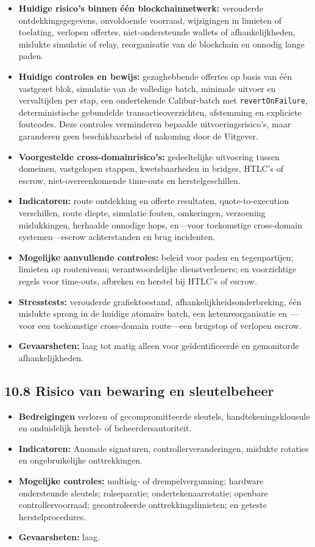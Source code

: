 \documentclass[11pt]{article}
\begin{document}
\begin{itemize}[leftmargin=*]
\item \textbf{Huidige risico's binnen één blockchainnetwerk:} verouderde ontdekkingsgegevens, onvoldoende voorraad, wijzigingen in limieten of toelating, verlopen offertes, niet-ondersteunde wallets of afhankelijkheden, mislukte simulatie of relay, reorganisatie van de blockchain en onnodig lange paden.
\item \textbf{Huidige controles en bewijs:} gezaghebbende offertes op basis van één vastgezet blok, simulatie van de volledige batch, minimale uitvoer en vervaltijden per stap, een ondertekende Calibur-batch met \texttt{revertOnFailure}, deterministische gebundelde transactieoverzichten, afstemming en expliciete foutcodes. Deze controles verminderen bepaalde uitvoeringsrisico's, maar garanderen geen beschikbaarheid of nakoming door de Uitgever.
\item \textbf{Voorgestelde cross-domainrisico's:} gedeeltelijke uitvoering tussen domeinen, vastgelopen stappen, kwetsbaarheden in bridges, HTLC's of escrow, niet-overeenkomende time-outs en herstelgeschillen.
\item \textbf{Indicatoren:} route ontdekking en offerte resultaten, quote-to-execution verschillen, route diepte, simulatie fouten, omkeringen, verzoening mislukkingen, herhaalde onnodige hops, en---voor toekomstige cross-domain systemen---escrow achterstanden en brug incidenten.
\item \textbf{Mogelijke aanvullende controles:} beleid voor paden en tegenpartijen; limieten op routeniveau; verantwoordelijke dienstverleners; en voorzichtige regels voor time-outs, afbreken en herstel bij HTLC's of escrow.
\item \textbf{Stresstests:} verouderde grafiektoestand, afhankelijkheidsonderbreking, één mislukte sprong in de huidige atomaire batch, een ketenreorganisatie en ---voor een toekomstige cross-domain route---een brugstop of verlopen escrow.
\item \textbf{Gevaarsheten:} laag tot matig alleen voor geïdentificeerde en gemonitorde afhankelijkheden.
\end{itemize}
\subsection*{10.8 Risico van bewaring en sleutelbeheer}

\begin{itemize}[leftmargin=*]
\item \textbf{Bedreigingen} verloren of gecompromitteerde sleutels, handtekeningsklousule en onduidelijk herstel- of beheerdersautoriteit.
\item \textbf{Indicatoren:} Anomale signaturen, controllerveranderingen, mislukte rotaties en ongebruikelijke onttrekkingen.
\item \textbf{Mogelijke controles:} multisig- of drempelvergunning; hardware ondersteunde sleutels; rolseparatie; ondertekenaarrotatie; openbare controllervoorraad; gecontroleerde onttrekkingslimieten; en geteste herstelprocedures.
\item \textbf{Gevaarsheten:} laag.
\end{itemize}
\end{document}
